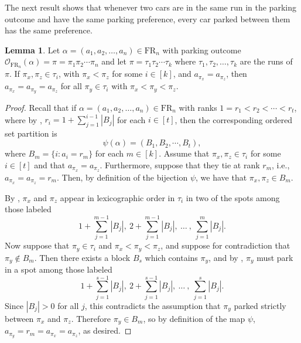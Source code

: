 \documentclass{amsart}
\theoremstyle{definition}
\newtheorem{lemma}{Lemma}[section]
\theoremstyle{definition}
\theoremstyle{remark}
\newcommand{\FR}[1]{\mathrm{FR}_{#1}}
\newcommand{\out}{\mathcal{O}}
\begin{document}
The next result shows that whenever two cars are in the same run in the parking outcome and have the same parking preference, every car parked between them has the same preference.

\begin{lemma}\label{lemma: equal ranks in runs}
    Let $\alpha=(a_1,a_2,\ldots,a_n)\in\FR{n}$ with parking outcome $\out_{\FR{n}}(\alpha)=\pi=\pi_1\pi_2\cdots\pi_n$ and  let $\pi=\tau_1\tau_2\cdots\tau_k$ where $\tau_1,\tau_2,\ldots,\tau_k$ are the runs of $\pi$. 
    If  $\pi_x,\pi_z\in\tau_i$, with $\pi_x < \pi_z$ for some $i\in[k]$, and $a_{\pi_x}=a_{\pi_z}$, then $a_{\pi_x}=a_{\pi_y}=a_{\pi_z}$ for all $\pi_y\in \tau_i$ with $\pi_x<\pi_y<\pi_z$. 
\end{lemma}
\begin{proof}
    Recall that if $\alpha=(a_1,a_2,\ldots,a_n)\in\FR{n}$ with ranks $1=r_1<r_2<\cdots<r_t$, where by , $r_i=1+\sum_{j=1}^{i-1}|B_j|$ for each $i\in[t]$, then the corresponding ordered set partition is
    \[\psi(\alpha)=(B_1,B_2,\cdots,B_t),\]
    where $B_m=\{i:a_i=r_m\}$ for each $m\in[k]$.
    Assume that $\pi_x,\pi_z\in\tau_i$ for some $i\in[t]$ and that $a_{\pi_x}=a_{\pi_{z}}$.
    Furthermore, suppose that they tie at rank $r_m$, i.e., $a_{\pi_x}=a_{\pi_{z}}=r_m$.
    Then, by definition of the bijection $\psi$, we have that $\pi_x,\pi_z\in B_m$.
    
    By , 
    $\pi_x$ and $\pi_z$ appear in lexicographic order in $\tau_i$ in two of the spots among those labeled
    \[1+\sum_{j=1}^{m-1}|B_j|, ~2+\sum_{j=1}^{m-1}|B_j|,~\ldots~, ~\sum_{j=1}^{m}|B_j|.\]
    Now suppose that $\pi_y\in \tau_i$ and $\pi_x <\pi_y < \pi_z$, and suppose for contradiction that $\pi_y\notin B_m$. 
Then there exists a block $B_{s}$ which contains $\pi_y$, and by , $\pi_y$ must park in a spot among those labeled 
\[1+\sum_{j=1}^{s-1}|B_j|, ~2+\sum_{j=1}^{s-1}|B_j|,~\ldots~, ~\sum_{j=1}^{s}|B_j|.\]
Since $|B_j|>0$ for all $j$, this contradicts the assumption that $\pi_y$ parked strictly between $\pi_x$ and $\pi_z$.
Therefore $\pi_y\in B_m$, so by definition of the map $\psi$, $a_{\pi_y}=r_m=a_{\pi_x}=a_{\pi_z}$, as desired.
\end{proof}
 
\end{document}
